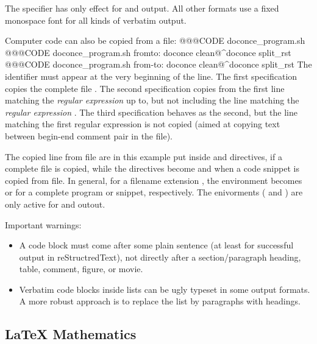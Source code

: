 \documentclass{book}
\begin{document}
{The  specifier has only effect for  and
 output. All other formats use a fixed monospace font for all
kinds of verbatim output.

Computer code can also be copied from a file:
\bccq
 @@@CODE doconce_program.sh
 @@@CODE doconce_program.sh  fromto: doconce clean@^doconce split_rst
 @@@CODE doconce_program.sh  from-to: doconce clean@^doconce split_rst
\eccq
The  identifier must appear at the very beginning of the line.
The first specification copies the complete file .
The second specification copies from the first line matching the \emph{regular
expression}  up to, but not including the line
matching the \emph{regular expression} .
The third specification behaves as the second, but the line matching
the first regular expression is not copied (aimed at copying
text between begin-end comment pair in the file).

The copied line from file are in this example put inside 
and  directives, if a complete file is copied, while the
directives become  and  when a code snippet is copied
from file. In general, for a filename extension , the environment
becomes  or  for a complete program or snippet,
respectively. The enivorments ( and ) are only active
for  and  outout.

Important warnings:

\begin{itemize}
 \item A code block must come after some plain sentence (at least for successful
   output in reStructredText), not directly after a section/paragraph heading,
   table, comment, figure, or movie.

 \item Verbatim code blocks inside lists can be ugly typeset in some
   output formats. A more robust approach is to replace the list by
   paragraphs with headings.
\end{itemize}

\noindent

\subsection{{\LaTeX} Mathematics}

}
\end{document}
